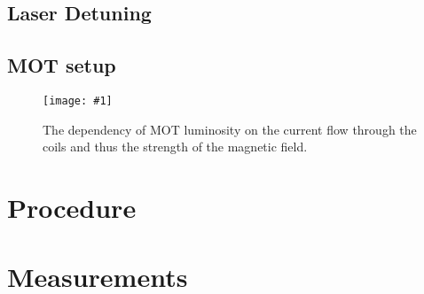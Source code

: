 \documentclass[twocolumn]{article}
\newcommand{\insertFigure}[1]{%
   \texttt{[image: \#1]}%
}
\begin{document}
\subsection{Laser Detuning}

\subsection{MOT setup}
\begin{figure} [!h]
	\centering
	\insertFigure{Images/MOT.png}
	\caption{The dependency of MOT luminosity on the current flow through the coils and thus the strength of the magnetic field.}
	\label{fig:MOT}
\end{figure}

\section{Procedure} \label{sec:Proc}

\section{Measurements}
\end{document}
